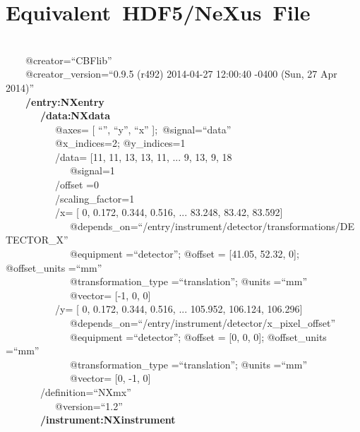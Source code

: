 \documentclass[11pt]{a0poster}
\begin{document}
\hspace{10mm}\hfill\begin{minipage}[]{0.29\linewidth}
\section*{Equivalent~HDF5/NeXus~File}

\fontsize{15}{21}\selectfont 
{}\\
\-\ ~~~@creator=``CBFlib''\\
\-\ ~~~@creator\_version=``0.9.5 (r492)  2014-04-27 12:00:40 -0400 (Sun, 27 Apr 2014)''\\
\-\ ~~~{\bf /entry:NXentry}\\
\-\ ~~~~~~{\bf /data:NXdata}\\
\-\ ~~~~~~~~~@axes= [ ``'', ``y'', ``x'' ];~@signal=``data''\\
\-\ ~~~~~~~~~@x\_indices=2; @y\_indices=1\\
\-\ ~~~~~~~~~/data= [11, 11, 13, 13, 11, ...  9, 13, 9, 18\\
\-\ ~~~~~~~~~~~~@signal=1\\
\-\ ~~~~~~~~~/offset =0\\
\-\ ~~~~~~~~~/scaling\_factor=1\\
\-\ ~~~~~~~~~/x= [ 0, 0.172, 0.344, 0.516, ... 83.248, 83.42, 83.592]\\
\-\ ~~~~~~~~~~~~@depends\_on=``/entry/instrument/detector/transformations/DETECTOR\_X''\\
\-\ ~~~~~~~~~~~~@equipment =``detector''; @offset = [41.05, 52.32, 0]; @offset\_units =``mm''\\
\-\ ~~~~~~~~~~~~@transformation\_type =``translation''; @units =``mm''\\
\-\ ~~~~~~~~~~~~@vector= [-1, 0, 0]\\
\-\ ~~~~~~~~~/y= [ 0, 0.172, 0.344, 0.516, ...  105.952, 106.124, 106.296]\\
\-\ ~~~~~~~~~~~~@depends\_on=``/entry/instrument/detector/x\_pixel\_offset''\\
\-\ ~~~~~~~~~~~~@equipment =``detector''; @offset = [0, 0, 0]; @offset\_units =``mm''\\
\-\ ~~~~~~~~~~~~@transformation\_type =``translation''; @units =``mm''\\
\-\ ~~~~~~~~~~~~@vector= [0, -1, 0]\\
\-\ ~~~~~~/definition=``NXmx''\\
\-\ ~~~~~~~~~@version=``1.2''\\
\-\ ~~~~~~{\bf /instrument:NXinstrument}\\

\end{minipage}
\end{document}
